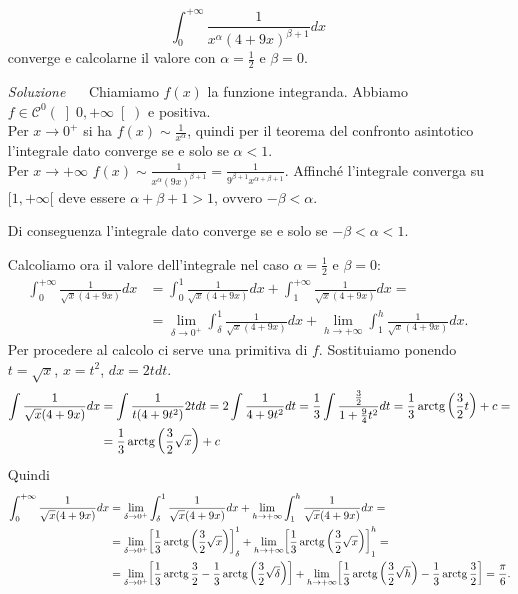 \documentclass{article}
\begin{document}
\begin{enumerate}[label=\textbf{Esercizio 11.\arabic*.},itemindent=*]
\[\int_0^{+\infty}\frac{1}{x^\alpha(4+9x)^{\beta+1}}dx\]
converge e calcolarne il valore con $\alpha=\frac{1}{2}$ e $\beta=0$. 
\item[\textit{\large Soluzione~}]~ Chiamiamo $f(x)$ la funzione integranda. Abbiamo $f\in \mathcal{C}^0\left( \left] 0,+\infty \right[ \right)$ e positiva.
\\ Per $x\to 0^+$ si ha $f(x)\sim \frac{1}{x^\alpha}$, quindi per il teorema del confronto asintotico l'integrale dato converge se e solo se $\alpha <1$. 
\\ Per $x\to +\infty$ $f(x)\sim\frac{1}{x^\alpha(9x)^{\beta+1}}=\frac{1}{9^{\beta+1}x^{\alpha+\beta+1}}$. Affinché l'integrale converga su $[1,+\infty[$ deve essere $\alpha+\beta+1>1$, ovvero $-\beta<\alpha$.

Di conseguenza l'integrale dato converge se e solo se $-\beta<\alpha<1$.


Calcoliamo ora il valore dell'integrale nel caso $\alpha=\frac{1}{2}$ e $\beta=0$:
\[\begin{aligned}\int_0^{+\infty}\frac{1}{\sqrt{x}(4+9x)}dx&=\int_0^1\frac{1}{\sqrt{x}(4+9x)}dx+\int_1^{+\infty}\frac{1}{\sqrt{x}(4+9x)}dx=\\&=\lim_{\delta\to {0^+}}\int_\delta^1\frac{1}{\sqrt{x}(4+9x)}dx+\lim_{h\to {+\infty}}\int_1^{h}\frac{1}{\sqrt{x}(4+9x)}dx.\end{aligned}\]
Per procedere al calcolo ci serve una primitiva di $f$. Sostituiamo ponendo $t=\sqrt{x}$, $x=t^2$, $dx=2tdt$.
\[\begin{aligned}
    \int\frac{1}{\sqrt{x}(4+9x)}dx&=\int\frac{1}{t(4+9t^2)}2tdt=2\int\frac{1}{4+9t^2}dt=\frac{1}{3}\int\frac{\frac{3}{2}}{1+\frac{9}{4}t^2}dt=\frac{1}{3}\operatorname{arctg}\left(\frac{3}{2}t\right)+c=\\&=\frac{1}{3}\operatorname{arctg}\left(\frac{3}{2}\sqrt{x}\right)+c
\end{aligned}\]
Quindi 
\[\begin{aligned}
    \int_0^{+\infty}\frac{1}{\sqrt{x}(4+9x)}dx&=
    \lim_{\delta\to {0^+}}\int_\delta^1\frac{1}{\sqrt{x}(4+9x)}dx+\lim_{h\to {+\infty}}\int_1^{h}\frac{1}{\sqrt{x}(4+9x)}dx=\\&=
    \lim_{\delta\to {0^+}}\biggl[\frac{1}{3}\operatorname{arctg}\left( \frac{3}{2} \sqrt{x}\right)\biggr]_\delta^1+\lim_{h\to {+\infty}}\biggl[\frac{1}{3}\operatorname{arctg}\left( \frac{3}{2} \sqrt{x}\right)\biggr]_1^{h}=\\&=
    \lim_{\delta\to {0^+}}\biggl[\frac{1}{3}\operatorname{arctg}\frac{3}{2}-\frac{1}{3}\operatorname{arctg}\left( \frac{3}{2} \sqrt{\delta}\right)\biggr]+\lim_{h\to {+\infty}}\biggl[\frac{1}{3}\operatorname{arctg}\left( \frac{3}{2} \sqrt{h}\right)-\frac{1}{3}\operatorname{arctg}\frac{3}{2}\biggr]=\frac{\pi}{6}.
\end{aligned}\]


\end{enumerate}
\end{document}
